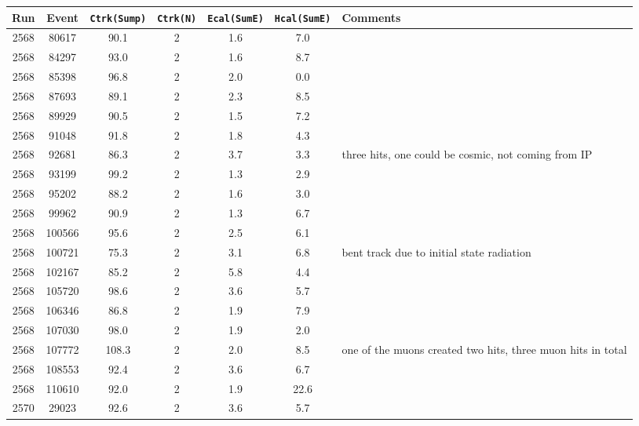 \begin{tabular}{ccccccl}
	\toprule
	Run & Event & \texttt{Ctrk(Sump)} & \texttt{Ctrk(N)} & \texttt{Ecal(SumE)} & \texttt{Hcal(SumE)} & Comments \\
	\midrule
	2568 & 80617  & 90.1  & 2 & 1.6 & 7.0  &  \\ \midrule
	2568 & 84297  & 93.0  & 2 & 1.6 & 8.7  &  \\
	2568 & 85398  & 96.8  & 2 & 2.0 & 0.0  &  \\
	2568 & 87693  & 89.1  & 2 & 2.3 & 8.5  &  \\
	2568 & 89929  & 90.5  & 2 & 1.5 & 7.2  &  \\
	2568 & 91048  & 91.8  & 2 & 1.8 & 4.3  &  \\
	2568 & 92681  & 86.3  & 2 & 3.7 & 3.3  &  three hits, one could be cosmic, not coming from IP\\
	2568 & 93199  & 99.2  & 2 & 1.3 & 2.9  &  \\
	2568 & 95202  & 88.2  & 2 & 1.6 & 3.0  &  \\
	2568 & 99962  & 90.9  & 2 & 1.3 & 6.7  &  \\
	2568 & 100566 & 95.6  & 2 & 2.5 & 6.1  &  \\
	2568 & 100721 & 75.3  & 2 & 3.1 & 6.8  &  bent track due to initial state radiation \\
	2568 & 102167 & 85.2  & 2 & 5.8 & 4.4  &  \\
	2568 & 105720 & 98.6  & 2 & 3.6 & 5.7  &  \\
	2568 & 106346 & 86.8  & 2 & 1.9 & 7.9  &  \\
	2568 & 107030 & 98.0  & 2 & 1.9 & 2.0  &  \\
	2568 & 107772 & 108.3 & 2 & 2.0 & 8.5  &  one of the muons created two hits, three muon hits in total\\
	2568 & 108553 & 92.4  & 2 & 3.6 & 6.7  &  \\
	2568 & 110610 & 92.0  & 2 & 1.9 & 22.6 & \korr{Warum soviel Hcal? Kann man das erklären?} \\
	2570 & 29023  & 92.6  & 2 & 3.6 & 5.7  &  \\
	\bottomrule
\end{tabular}
